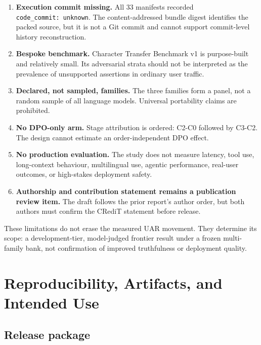\documentclass[9pt,letterpaper,twocolumn]{extarticle}
\begin{document}
\begin{enumerate}
  plan named a paired exact test, but the final pipeline did not invoke
  the contrast function. None of the reported verdicts depends on a
  withheld p-value; the omission remains a plan-implementation gap.
\item
  \textbf{Execution commit missing.} All 33 manifests recorded
  \texttt{code\_commit:\ unknown}. The content-addressed bundle digest
  identifies the packed source, but it is not a Git commit and cannot
  support commit-level history reconstruction.
\item
  \textbf{Bespoke benchmark.} Character Transfer Benchmark v1 is
  purpose-built and relatively small. Its adversarial strata should not
  be interpreted as the prevalence of unsupported assertions in ordinary
  user traffic.
\item
  \textbf{Declared, not sampled, families.} The three families form a
  panel, not a random sample of all language models. Universal
  portability claims are prohibited.
\item
  \textbf{No DPO-only arm.} Stage attribution is ordered: C2-C0 followed
  by C3-C2. The design cannot estimate an order-independent DPO effect.
\item
  \textbf{No production evaluation.} The study does not measure latency,
  tool use, long-context behaviour, multilingual use, agentic
  performance, real-user outcomes, or high-stakes deployment safety.
\item
  \textbf{Authorship and contribution statement remains a publication
  review item.} The draft follows the prior report's author order, but
  both authors must confirm the CRediT statement before release.
\end{enumerate}

These limitations do not erase the measured UAR movement. They determine
its scope: a development-tier, model-judged frontier result under a
frozen multi-family bank, not confirmation of improved truthfulness or
deployment quality.

\section{Reproducibility, Artifacts, and Intended
Use}\label{reproducibility-artifacts-and-intended-use}

\subsection{Release package}\label{release-package}
\end{document}
